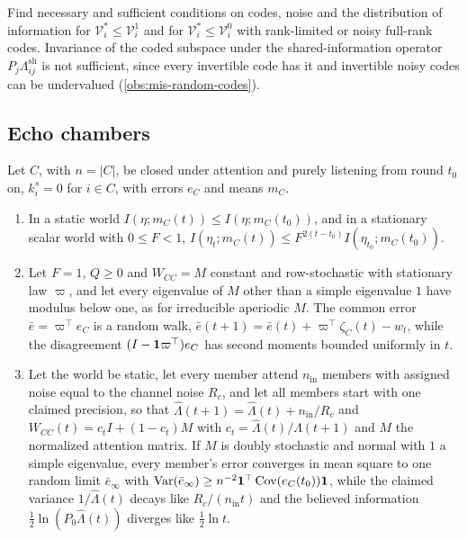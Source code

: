 \begin{openproblem}\label{open:mis-scope}
Find necessary and sufficient conditions on codes, noise and the distribution of information for $\mathcal V^\ast_i\le\mathcal V^1_i$ and for $\mathcal V^\ast_i\le\mathcal V^0_i$ with rank-limited or noisy full-rank codes. Invariance of the coded subspace under the shared-information operator $P_j\Lambda^{\mathrm{sh}}_{ij}$ is not sufficient, since every invertible code has it and invertible noisy codes can be undervalued (\cref{obs:mis-random-codes}).
\end{openproblem}

\subsection{Echo chambers}\label{sup:mis-echo-chambers}

\begin{proposition}\label{prop:mis-pure-listening}
Let $C$, with $n=\lvert C\rvert$, be closed under attention and purely listening from round $t_0$ on, $k^s_i=0$ for $i\in C$, with errors $e_C$ and means $m_C$.
\begin{enumerate}
\item[(a)] In a static world $I(\eta;m_C(t))\le I(\eta;m_C(t_0))$, and in a stationary scalar world with $0\le F<1$, $I(\eta_t;m_C(t))\le F^{2(t-t_0)}I(\eta_{t_0};m_C(t_0))$.
\item[(b)] Let $F=1$, $Q\ge0$ and $W_{CC}=M$ constant and row-stochastic with stationary law $\varpi$, and let every eigenvalue of $M$ other than a simple eigenvalue $1$ have modulus below one, as for irreducible aperiodic $M$. The common error $\bar e=\varpi^\top e_C$ is a random walk, $\bar e(t+1)=\bar e(t)+\varpi^\top\zeta_C(t)-w_t$, while the disagreement $(I-\mathbf{1}\varpi^\top)e_C$ has second moments bounded uniformly in $t$.
\item[(c)] Let the world be static, let every member attend $n_{\mathrm{in}}$ members with assigned noise equal to the channel noise $R_c$, and let all members start with one claimed precision, so that $\hat\Lambda(t+1)=\hat\Lambda(t)+n_{\mathrm{in}}/R_c$ and $W_{CC}(t)=c_tI+(1-c_t)M$ with $c_t=\hat\Lambda(t)/\hat\Lambda(t+1)$ and $M$ the normalized attention matrix. If $M$ is doubly stochastic and normal with $1$ a simple eigenvalue, every member's error converges in mean square to one random limit $\bar e_\infty$ with $\operatorname{Var}(\bar e_\infty)\ge n^{-2}\mathbf{1}^\top\operatorname{Cov}(e_C(t_0))\mathbf{1}$, while the claimed variance $1/\hat\Lambda(t)$ decays like $R_c/(n_{\mathrm{in}}t)$ and the believed information $\tfrac12\ln(P_0\hat\Lambda(t))$ diverges like $\tfrac12\ln t$.
\end{enumerate}
\end{proposition}

